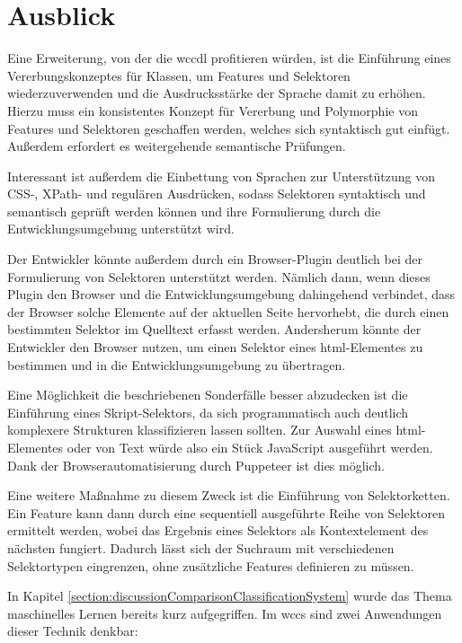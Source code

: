 \section{Ausblick}
    \label{section:endingOutlook}
    Eine Erweiterung, von der die \gls{wccdl} profitieren würden,
    ist die Einführung eines Vererbungskonzeptes für Klassen,
    um Features und Selektoren wiederzuverwenden und die Ausdrucksstärke
    der Sprache damit zu erhöhen.
    Hierzu muss ein konsistentes Konzept für Vererbung und Polymorphie
    von Features und Selektoren geschaffen werden,
    welches sich syntaktisch gut einfügt.
    Außerdem erfordert es weitergehende semantische Prüfungen.

    Interessant ist außerdem die Einbettung
    von Sprachen zur Unterstützung von CSS-, XPath- und regulären Ausdrücken,
    sodass Selektoren syntaktisch und semantisch geprüft werden können
    und ihre Formulierung durch die Entwicklungsumgebung unterstützt wird.

    Der Entwickler könnte außerdem durch ein Browser-Plugin
    deutlich bei der Formulierung von Selektoren unterstützt werden.
    Nämlich dann, wenn dieses Plugin den Browser und die Entwicklungsumgebung
    dahingehend verbindet, dass der Browser solche Elemente auf der aktuellen Seite
    hervorhebt, die durch einen bestimmten Selektor im Quelltext erfasst werden.
    Andersherum könnte der Entwickler den Browser nutzen,
    um einen Selektor eines \gls{html}-Elementes zu bestimmen und
    in die Entwicklungsumgebung zu übertragen.

    Eine Möglichkeit die beschriebenen Sonderfälle besser abzudecken ist die
    Einführung eines Skript-Selektors,
    da sich programmatisch auch deutlich komplexere Strukturen klassifizieren lassen sollten.
    Zur Auswahl eines \gls{html}-Elementes oder von Text würde also ein Stück JavaScript ausgeführt werden.
    Dank der Browserautomatisierung durch Puppeteer ist dies möglich.

    Eine weitere Maßnahme zu diesem Zweck ist die Einführung von Selektorketten.
    Ein Feature kann dann durch eine sequentiell ausgeführte Reihe von Selektoren
    ermittelt werden, wobei das Ergebnis eines Selektors als Kontextelement des nächsten fungiert.
    Dadurch lässt sich der Suchraum mit verschiedenen Selektortypen eingrenzen,
    ohne zusätzliche Features definieren zu müssen.

    In Kapitel \ref{section:discussionComparisonClassificationSystem}
    wurde das Thema maschinelles Lernen bereits kurz aufgegriffen.
    Im \gls{wccs} sind zwei Anwendungen dieser Technik denkbar:

